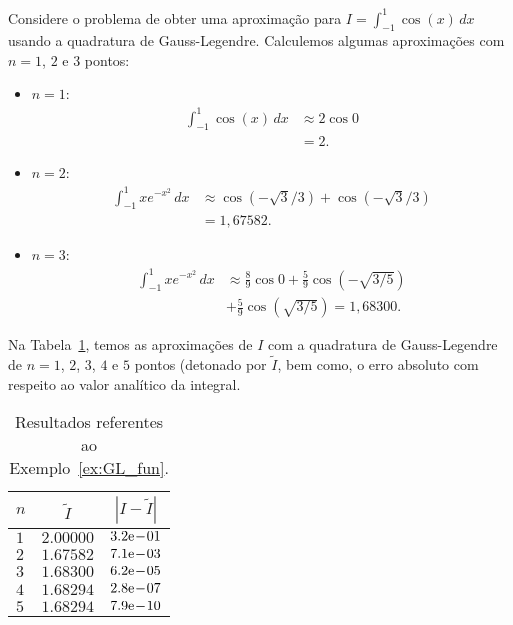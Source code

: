 \begin{ex}\label{ex:GL_fun}
  Considere o problema de obter uma aproximação para $I = \int_{-1}^1 \cos(x)\,dx$ usando a quadratura de Gauss-Legendre. Calculemos algumas aproximações com $n=1$, $2$ e $3$ pontos:
  \begin{itemize}
  \item $n=1$:
    \begin{subequations}
      \begin{align}
        \int_{-1}^1 \cos(x)\,dx &\approx 2 \cos 0 \\
                                &= 2.
      \end{align}
    \end{subequations}
  \item $n=2$:
    \begin{subequations}
      \begin{align}
        \int_{-1}^1 xe^{-x^2}\,dx &\approx \cos(-\sqrt{3}/3) + \cos(-\sqrt{3}/3)\\
                                  &= 1,67582.
      \end{align}
    \end{subequations}
  \item $n=3$:
    \begin{subequations}
      \begin{align}
        \int_{-1}^1 xe^{-x^2}\,dx &\approx \frac{8}{9}\cos 0 + \frac{5}{9}\cos(-\sqrt{3/5})\nonumber\\
                                  &+ \frac{5}{9}\cos(\sqrt{3/5}) = 1,68300.
      \end{align}
  \end{subequations}
  \end{itemize}

  Na Tabela~\ref{tab:ex_GL_fun}, temos as aproximações de $I$ com a quadratura de Gauss-Legendre de $n=1$, $2$, $3$, $4$ e $5$ pontos (detonado por $\tilde{I}$, bem como, o erro absoluto com respeito ao valor analítico da integral.

  \begin{table}[H]
  \centering
  \caption{Resultados referentes ao Exemplo~\ref{ex:GL_fun}.}
  \begin{tabular}{lcc}\toprule
    $n$ & $\tilde{I}$ & $|I-\tilde{I}|$ \\\midrule
    $1$ & $2.00000$ & $3.2\mathrm{e}\!-\!01$ \\
    $2$ & $1.67582$ & $7.1\mathrm{e}\!-\!03$ \\
    $3$ & $1.68300$ & $6.2\mathrm{e}\!-\!05$ \\
    $4$ & $1.68294$ & $2.8\mathrm{e}\!-\!07$ \\
    $5$ & $1.68294$ & $7.9\mathrm{e}\!-\!10$ \\\bottomrule
  \end{tabular}
  \label{tab:ex_GL_fun}
\end{table}


\end{ex}
